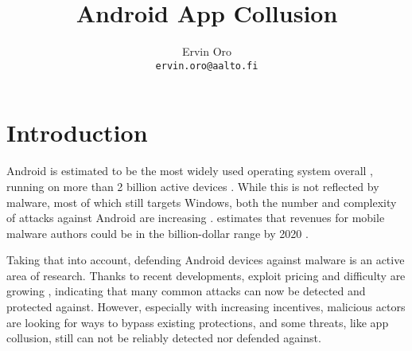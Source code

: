\documentclass[article]{aaltoseries}
\newcommand{\TODO}[1]{\todo[inline]{#1}}
\begin{document}
 

\title{Android App Collusion}

\author{Ervin Oro%
\\\textnormal{\texttt{ervin.oro@aalto.fi}}} %


\maketitle


\begin{abstract}
\TODO{abstract}


\end{abstract}




\section{Introduction}

Android is estimated to be the most widely used operating system overall \cite{AWSLLC2018, StatCounter2018}, running on more than 2 billion active devices \cite{AOSP2018}. While this is not reflected by malware,  most of which still targets Windows, both the number and complexity of attacks against Android are increasing \cite{AVTESTGH2018}. \citeauthor{McAfee2018} estimates that revenues for mobile malware authors could be in the billion-dollar range by 2020 \cite{McAfee2018}.

Taking that into account, defending Android devices against malware is an active area of research. Thanks to recent developments, exploit pricing and difficulty are growing \cite{AOSP2018}, indicating that many common attacks can now be detected and protected against. However, especially with increasing incentives, malicious actors are looking for ways to bypass existing protections, and some threats, like app collusion, still can not be reliably detected nor defended against.
\end{document}
